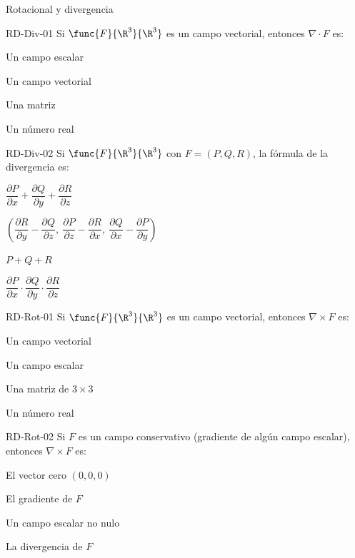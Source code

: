 \documentclass[a4,11pt]{aleph-notas}
\begin{document}
\begin{quiz}{Rotacional y divergencia}

\begin{multi}[]%
    {RD-Div-01}
    Si $\func{F}{\R^3}{\R^3}$ es un campo vectorial, entonces $\nabla \cdot F$ es:
    \item* Un campo escalar
    \item Un campo vectorial
    \item Una matriz
    \item Un número real
\end{multi}

\begin{multi}[]%
    {RD-Div-02}
    Si $\func{F}{\R^3}{\R^3}$ con $F=(P,Q,R)$, la fórmula de la divergencia es:
    \item* $\dfrac{\partial P}{\partial x} + \dfrac{\partial Q}{\partial y} + \dfrac{\partial R}{\partial z}$
    \item $\left(\dfrac{\partial R}{\partial y} - \dfrac{\partial Q}{\partial z},\ \dfrac{\partial P}{\partial z} - \dfrac{\partial R}{\partial x},\ \dfrac{\partial Q}{\partial x} - \dfrac{\partial P}{\partial y}\right)$
    \item $P + Q + R$
    \item $\dfrac{\partial P}{\partial x} \cdot \dfrac{\partial Q}{\partial y} \cdot \dfrac{\partial R}{\partial z}$
\end{multi}

\begin{multi}[]%
    {RD-Rot-01}
    Si $\func{F}{\R^3}{\R^3}$ es un campo vectorial, entonces $\nabla \times F$ es:
    \item* Un campo vectorial
    \item Un campo escalar
    \item Una matriz de $3\times 3$
    \item Un número real
\end{multi}

\begin{multi}[]%
    {RD-Rot-02}
    Si $F$ es un campo conservativo (gradiente de algún campo escalar), entonces $\nabla \times F$ es:
    \item* El vector cero $(0,0,0)$
    \item El gradiente de $F$
    \item Un campo escalar no nulo
    \item La divergencia de $F$
\end{multi}


\end{quiz}
\end{document}
